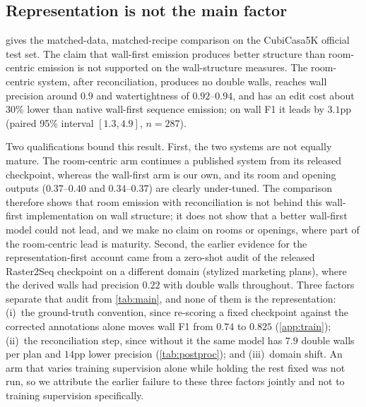 \documentclass{article}
\begin{document}
\subsection{Representation is not the main factor}\label{sec:refute}
 gives the matched-data, matched-recipe comparison on the
CubiCasa5K official test set. The claim that wall-first emission produces
better structure than room-centric emission is not supported on the
wall-structure measures. The room-centric system, after reconciliation,
produces no double walls, reaches wall precision around $0.9$ and
watertightness of $0.92$--$0.94$, and has an edit cost about 30\% lower than native wall-first
sequence emission; on wall F1 it leads by $3.1$pp (paired 95\% interval
$[1.3,4.9]$, $n=287$).

Two qualifications bound this result. First, the two systems are not equally
mature. The room-centric arm continues a published system from its released
checkpoint, whereas the wall-first arm is our own, and its room and opening
outputs ($0.37$--$0.40$ and $0.34$--$0.37$) are clearly under-tuned. The
comparison therefore shows that room emission with reconciliation is not
behind this wall-first implementation on wall structure; it does not show that
a better wall-first model could not lead, and we make no claim on rooms or
openings, where part of the room-centric lead is maturity. Second, the earlier
evidence for the representation-first account came from a zero-shot audit of
the released Raster2Seq checkpoint on a different domain (stylized marketing
plans), where the derived walls had precision $0.22$ with double walls
throughout. Three factors separate that audit from \cref{tab:main}, and none
of them is the representation: (i)~the ground-truth convention, since
re-scoring a fixed checkpoint against the corrected annotations alone moves
wall F1 from $0.74$ to $0.825$ (\cref{app:train}); (ii)~the reconciliation
step, since without it the same model has $7.9$ double walls per plan and
$14$pp lower precision (\cref{tab:postproc}); and (iii)~domain shift. An arm
that varies training supervision alone while holding the rest fixed was not
run, so we attribute the earlier failure to these three factors jointly and
not to training supervision specifically.
\end{document}
